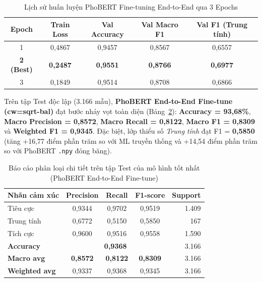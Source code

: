 \documentclass[12pt,a4paper]{article}
\begin{document}
\begin{table}[htbp]
\centering
\caption{Lịch sử huấn luyện PhoBERT Fine-tuning End-to-End qua 3 Epochs}
\label{tab:text_exp4_hist}
\small
\begin{tabular}{|c|c|c|c|c|}
\hline
\textbf{Epoch} & \textbf{Train Loss} & \textbf{Val Accuracy} & \textbf{Val Macro F1} & \textbf{Val F1 (Trung tính)} \\
\hline
1 & 0,4867 & 0,9457 & 0,8567 & 0,6557 \\
\hline
\textbf{2 (Best)} & \textbf{0,2487} & \textbf{0,9551} & \textbf{0,8766} & \textbf{0,6977} \\
\hline
3 & 0,1849 & 0,9514 & 0,8708 & 0,6866 \\
\hline
\end{tabular}
\end{table}

Trên tập Test độc lập (3.166 mẫu), \textbf{PhoBERT End-to-End Fine-tune (cw=sqrt-bal)} đạt bước nhảy vọt toàn diện (Bảng~\ref{tab:text_exp4_report}): \textbf{Accuracy = 93,68\%}, \textbf{Macro Precision = 0,8572}, \textbf{Macro Recall = 0,8122}, \textbf{Macro F1 = 0,8309} và \textbf{Weighted F1 = 0,9345}. Đặc biệt, lớp thiểu số \textit{Trung tính} đạt F1 = \textbf{0,5850} (tăng +16,77 điểm phần trăm so với ML truyền thống và +14,54 điểm phần trăm so với PhoBERT \texttt{.npy} đóng băng).

\begin{table}[htbp]
\centering
\caption{Báo cáo phân loại chi tiết trên tập Test của mô hình tốt nhất (PhoBERT End-to-End Fine-tune)}
\label{tab:text_exp4_report}
\small
\begin{tabular}{|l|c|c|c|r|}
\hline
\textbf{Nhãn cảm xúc} & \textbf{Precision} & \textbf{Recall} & \textbf{F1-score} & \textbf{Support} \\
\hline
Tiêu cực   & 0,9344 & 0,9702 & 0,9519 & 1.409 \\
Trung tính & 0,6772 & 0,5150 & 0,5850 & 167   \\
Tích cực   & 0,9600 & 0,9516 & 0,9558 & 1.590 \\
\hline
\textbf{Accuracy}     & \multicolumn{3}{c|}{\textbf{0,9368}} & 3.166 \\
\textbf{Macro avg}    & \textbf{0,8572} & \textbf{0,8122} & \textbf{0,8309} & 3.166 \\
\textbf{Weighted avg} & 0,9337 & 0,9368 & 0,9345 & 3.166 \\
\hline
\end{tabular}
\end{table}
\end{document}
